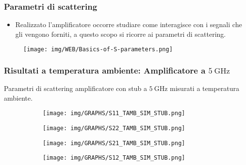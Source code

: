 \documentclass{beamer}
\begin{document}
\begin{frame}
    \frametitle{Parametri di scattering}
    \begin{itemize}
        \item Realizzato l'amplificatore occorre studiare come interagisce con
        i segnali che gli vengono forniti, a questo scopo si ricorre ai parametri di scattering.
    \end{itemize}
    \begin{figure}
        \centering
        \texttt{[image: img/WEB/Basics-of-S-parameters.png]}
    \end{figure}
    
\end{frame}


\begin{frame}
    \frametitle{Risultati a temperatura ambiente: Amplificatore a $\SI{5}{\giga\hertz}$}
    Parametri di scattering amplificatore con stub a $\SI{5}{\giga\hertz}$ misurati a temperatura ambiente.
    \begin{figure}[!htbp]
        \centering
        \begin{subfigure}[t]{0.4\textwidth}
            \centering
            \texttt{[image: img/GRAPHS/S11\_TAMB\_SIM\_STUB.png]}
            
        \end{subfigure}
        \hfill
        \begin{subfigure}[t]{0.4\textwidth}
            \centering
            \texttt{[image: img/GRAPHS/S22\_TAMB\_SIM\_STUB.png]}
            
        \end{subfigure}
        \hfill
        \centering
        \begin{subfigure}[t]{0.4\textwidth}
            \centering
            \texttt{[image: img/GRAPHS/S21\_TAMB\_SIM\_STUB.png]}
            
        \end{subfigure}
        \hfill
        \begin{subfigure}[t]{0.4\textwidth}
            \centering
            \texttt{[image: img/GRAPHS/S12\_TAMB\_SIM\_STUB.png]}
            
        \end{subfigure}
    \end{figure}
\end{frame}
\end{document}
